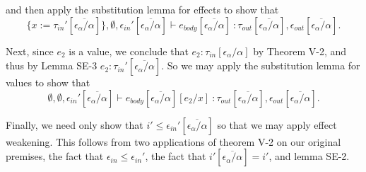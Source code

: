 \documentclass{article}
\begin{document}
\begin{itemize}
	and then apply the substitution lemma for effects to show that 
	$$\{x := \tau_{in}'[\overline{\epsilon_\alpha/\alpha}]\}, \emptyset, \epsilon_{in}'[\overline{\epsilon_\alpha/\alpha}] \vdash e_{body}[\overline{\epsilon_\alpha/\alpha}]\ \colon \tau_{out}[\overline{\epsilon_\alpha/\alpha}], \epsilon_{out}[\overline{\epsilon_\alpha/\alpha}].$$

	Next, since $e_2$ is a value, we conclude that $e_2 : \tau_{in}[\epsilon_\alpha/\alpha]$ by Theorem V-2, and thus by Lemma SE-3 $e_2 : \tau_{in}'[\overline{\epsilon_\alpha/\alpha}]$. So we may apply the substitution lemma for values to show that
	$$\emptyset, \emptyset, \epsilon_{in}'[\overline{\epsilon_\alpha/\alpha}] \vdash e_{body}[\overline{\epsilon_\alpha/\alpha}][e_2/x]\ \colon \tau_{out}[\overline{\epsilon_\alpha/\alpha}], \epsilon_{out}[\overline{\epsilon_\alpha/\alpha}].$$
	
	Finally, we need only show that $i' \leq \epsilon_{in}'[\overline{\epsilon_\alpha/\alpha}]$ so that we may apply effect weakening. This follows from two applications of theorem V-2 on our original premises, the fact that $\epsilon_{in} \leq \epsilon_{in}'$, the fact that $i'[\overline{\epsilon_\alpha/\alpha}] = i'$, and lemma SE-2.
\end{itemize}
\end{document}
